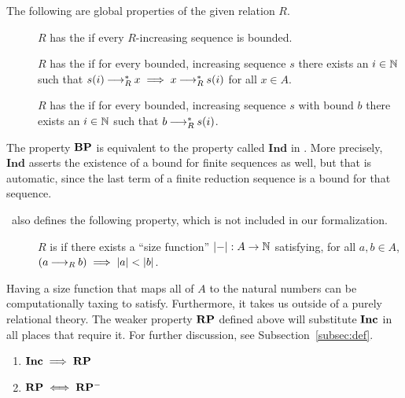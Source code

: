 \begin{definition} \label{def:rp}
  The following are global properties of the given relation $R$.  \hfill
    \begin{description}
        \item[\bq {}] $R$ has the  if every $R$-increasing sequence is bounded.
        \item[\bq {}] $R$ has the  if for every bounded, increasing sequence $s$ there exists an $i \in \mathbb{N}$ such that
        $s (i) \mathbin{\longrightarrow_R^*} x \implies x \mathbin{\longrightarrow_R^*} s (i)$ for all $x\in A$.
        \item[\bq {}] $R$ has the  if for every bounded, increasing sequence $s$ with bound $b$ there exists an $i \in \mathbb{N}$ such that $b \mathbin{\longrightarrow_R^*} s (i)$.
    \end{description}
\end{definition}

The property $\mathbf{BP}$ is equivalent to the property called $\mathbf{Ind}$ in \terese. More precisely, $\mathbf{Ind}$ asserts the existence of a bound for finite sequences as well, but that is automatic, since the last term of a finite reduction sequence is a bound for that sequence.

\terese $\,$ also defines the following property, which is not included in our formalization.

\begin{definition} \hfill
    \begin{description}
        \item[\bq  {}] $R$ is  if there exists a ``size function'' $|{-}| : A \to \mathbb{N}$ satisfying, for all $a, b \in A$,
        $(a \mathbin{\longrightarrow_R} b) \implies |a| < |b|$.
    \end{description}
\end{definition}

Having a size function that maps all of $A$ to the natural numbers can be computationally taxing to satisfy.
Furthermore, it takes us outside of a purely relational theory. The weaker property $\mathbf{RP}$ defined above will substitute $\mathbf{Inc}$ in all places that require it. For further discussion, see Subsection~\ref{subsec:def}.

\newpage
\begin{proposition}\hfill
    \begin{enumerate}
        \item $\mathbf{Inc} \implies \mathbf{RP}$
        \item $\mathbf{RP} \iff \mathbf{RP^{-}}$
    \end{enumerate}
\end{proposition}

